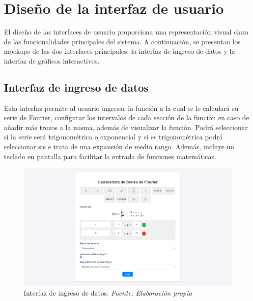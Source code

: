 \newpage

\section{Diseño de la interfaz de usuario}
El diseño de las interfaces de usuario proporciona una representación visual clara de las funcionalidades principales del sistema. A continuación, se presentan los mockups de las dos interfaces principales: la interfaz de ingreso de datos y la interfaz de gráficos interactivos.
\subsection{Interfaz de ingreso de datos}
Esta interfaz permite al usuario ingresar la función a la cual se le calculará su serie de Fourier, configurar los intervalos de cada sección de la función en caso de añadir más trozos a la misma, además de visualizar la función. Podrá seleccionar si la serie será trigonométrica o exponencial y si es trigonométrica podrá seleccionar sis e trata de una expansión de medio rango.  Además, incluye un teclado en pantalla para facilitar la entrada de funciones matemáticas.
\begin{figure}[H]
	\centering
	\includegraphics[width=1\textwidth]{img/chapter04/mockup_datos.png}
	\caption[Interfaz de ingreso de datos.]{Interfaz de ingreso de datos. \textit{Fuente: \textit{Elaboración propia}}}
	\label{fig:mockup_datos}
\end{figure}


